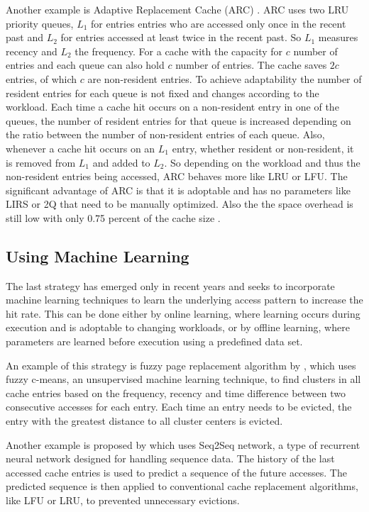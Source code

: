 \documentclass[
	12pt,
	a4paper,
	abstract,
	bibliography=totoc,
	chapterprefix,
	headings=openright,
	numbers=endperiod,
	parskip=half,
	twoside,
]{scrreprt}
\begin{document}
Another example is Adaptive Replacement Cache (ARC) \cite{270366}.
ARC uses two LRU priority queues, $L_1$ for entries entries who are accessed only once in the recent past and $L_2$ for entries accessed at least twice in the recent past.
So $L_1$ measures recency and $L_2$ the frequency.
For a cache with the capacity for $c$ number of entries and each queue can also hold $c$ number of entries.
The cache saves $2c$ entries, of which $c$ are non-resident entries.
To achieve adaptability the number of resident entries for each queue is not fixed and changes according to the workload.
Each time a cache hit occurs on a non-resident entry in one of the queues, the number of resident entries for that queue is increased
depending on the ratio between the number of non-resident entries of each queue.
Also, whenever a cache hit occurs on an $L_1$ entry, whether resident or non-resident, it is removed from $L_1$ and added to $L_2$.
So depending on the workload and thus the non-resident entries being accessed, ARC behaves more like LRU or LFU.
The significant advantage of ARC is that it is adoptable and has no parameters like LIRS or 2Q that need to be manually optimized.
Also the the space overhead is still low with only 0.75 percent of the cache size \cite{megiddo2004outperforming}.

\subsection{Using Machine Learning}

The last strategy has emerged only in recent years and seeks to incorporate machine learning techniques to learn the underlying access pattern to increase the hit rate.
This can be done either by online learning, where learning occurs during execution and is adoptable to changing workloads, or by offline learning, where parameters are learned before execution using a predefined data set.

An example of this strategy is fuzzy page replacement algorithm by \cite{akbari2020page}, which uses
fuzzy c-means, an unsupervised machine learning technique, to find clusters in all cache entries based on the frequency, recency and time difference between two consecutive accesses for each entry.
Each time an entry needs to be evicted, the entry with the greatest distance to all cluster centers is evicted.

Another example is proposed by \cite{choi2022learning} which uses Seq2Seq network, a type of recurrent neural network designed for handling sequence data.
The history of the last accessed cache entries is used to predict a sequence of the future accesses.
The predicted sequence is then applied to conventional cache replacement algorithms, like LFU or LRU, to prevented unnecessary evictions. 
\end{document}
